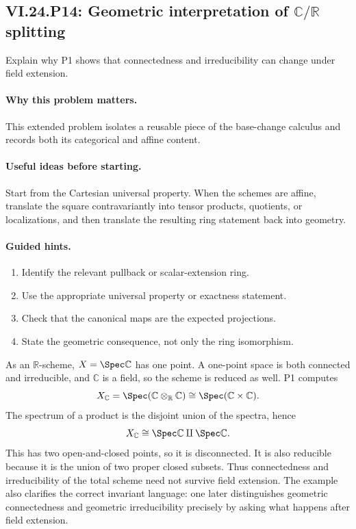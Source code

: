 \subsection*{VI.24.P14: Geometric interpretation of $\mathbb C/\mathbb R$ splitting}
\begin{problem}\label{prob:vi24-p14}
Explain why P1 shows that connectedness and irreducibility can change under field extension.
\end{problem}

\ifdefined\FullProblemDossiers
\paragraph{Why this problem matters.}
This extended problem isolates a reusable piece of the base-change calculus and records both its categorical and affine content.

\paragraph{Useful ideas before starting.}
Start from the Cartesian universal property.  When the schemes are affine, translate the square contravariantly into tensor products, quotients, or localizations, and then translate the resulting ring statement back into geometry.

\paragraph{Guided hints.}
\begin{enumerate}
\item Identify the relevant pullback or scalar-extension ring.
\item Use the appropriate universal property or exactness statement.
\item Check that the canonical maps are the expected projections.
\item State the geometric consequence, not only the ring isomorphism.
\end{enumerate}

\begin{solution}
As an $\mathbb R$-scheme, $X=\Spec\mathbb C$ has one point.  A one-point space is both connected and irreducible, and $\mathbb C$ is a field, so the scheme is reduced as well.  P1 computes
\[
X_{\mathbb C}=\Spec(\mathbb C\otimes_{\mathbb R}\mathbb C)
\cong\Spec(\mathbb C\times\mathbb C).
\]
The spectrum of a product is the disjoint union of the spectra, hence
\[
X_{\mathbb C}\cong\Spec\mathbb C\amalg\Spec\mathbb C.
\]
This has two open-and-closed points, so it is disconnected.  It is also reducible because it is the union of two proper closed subsets.  Thus connectedness and irreducibility of the total scheme need not survive field extension.  The example also clarifies the correct invariant language: one later distinguishes geometric connectedness and geometric irreducibility precisely by asking what happens after field extension.
\end{solution}

